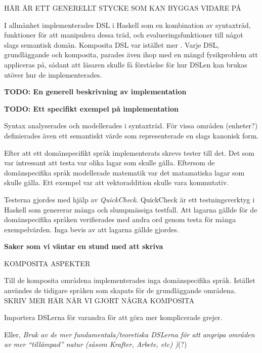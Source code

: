 \begin{binge}

HÄR ÄR ETT GENERELLT STYCKE SOM KAN BYGGAS VIDARE PÅ

I allmänhet implementerades DSL i Haskell som en kombination av syntaxträd,
funktioner för att manipulera dessa träd, och evalueringsfunktioner till något
slags semantisk domän. Komposita DSL var
istället mer . Varje DSL, grundläggande och komposita,
parades även ihop med en mängd fysikproblem att appliceras på, sådant att
läsaren skulle få förståelse för hur DSLen kan brukas utöver hur de
implementerades.

\textbf{TODO: En generell beskrivning av implementation}

\textbf{TODO: Ett specifikt exempel på implementation}

Syntax analyserades och modellerades i syntaxträd. För vissa områden
(enheter?) definierades även ett semantiskt värde som representerade
en slags kanonisk form.

\end{binge}
\begin{draft}

Efter att ett domänspecifikt språk implementerats skrevs tester till det. Det som var intressant att testa var olika lagar som skulle gälla. Eftersom de domänspecifika språk modellerade matematik var det matamatiska lagar som skulle gälla. Ett exempel var att vektoraddition skulle vara kommutativ.

Testerna gjordes med hjälp av \textit{QuickCheck}. QuickCheck är ett testningsverktyg i Haskell som genererar många och slumpmässiga testfall. Att lagarna gällde för de domänspecifika språken verifierades med andra ord genom testa för många exempelvärden. Inga bevis av att lagarna gällde gjordes.

\end{draft}
\begin{binge}

\textbf{Saker som vi väntar en stund med att skriva}

KOMPOSITA ASPEKTER

Till de komposita områdena implementerades inga domänspecifika språk. Istället användes de tidigare språken som skapats för de grundläggande områdena. SKRIV MER HÄR NÄR VI GJORT NÅGRA KOMPOSITA

Importera DSLerna för varandra för att göra mer komplicerade grejer.

Eller, \emph{Bruk av de mer fundamentala/teoretiska DSLerna för att
  angripa områden av mer ``tillämpad'' natur (såsom Krafter, Arbete,
  etc) )}(?)

\end{binge}
